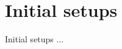 \clearpage %

\section*{Initial setups}
\label{sec:Appendix/Initial setups}
Initial setups ...









